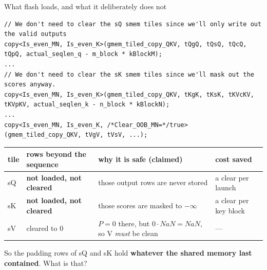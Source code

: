 \documentclass[aspectratio=169,11pt]{beamer}
\newcommand{\NaN}{NaN}
\begin{document}
\begin{frame}[fragile]{What flash loads, and what it deliberately does not}
\begin{lstlisting}
// We don't need to clear the sQ smem tiles since we'll only write out the valid outputs
copy<Is_even_MN, Is_even_K>(gmem_tiled_copy_QKV, tQgQ, tQsQ, tQcQ, tQpQ, actual_seqlen_q - m_block * kBlockM);
...
// We don't need to clear the sK smem tiles since we'll mask out the scores anyway.
copy<Is_even_MN, Is_even_K>(gmem_tiled_copy_QKV, tKgK, tKsK, tKVcKV, tKVpKV, actual_seqlen_k - n_block * kBlockN);
...
copy<Is_even_MN, Is_even_K, /*Clear_OOB_MN=*/true>(gmem_tiled_copy_QKV, tVgV, tVsV, ...);
\end{lstlisting}
\vspace{1mm}
\begin{center}\scriptsize
\begin{tabular}{l>{\raggedright\arraybackslash}p{3.4cm}>{\raggedright\arraybackslash}p{5.6cm}>{\raggedright\arraybackslash}p{2.6cm}}
\toprule
tile & rows beyond the sequence & why it is safe (claimed) & cost saved \\
\midrule
sQ & \textbf{not loaded, not cleared} & those output rows are never stored & a clear per launch \\
sK & \textbf{not loaded, not cleared} & those scores are masked to $-\infty$ & a clear per key block \\
sV & cleared to 0 & $P=0$ there, but $0\cdot\NaN=\NaN$, so V \emph{must} be clean & --- \\
\bottomrule
\end{tabular}
\end{center}
\vspace{1mm}
\small So the padding rows of sQ and sK hold \textbf{whatever the shared memory last contained}. What is that?
\end{frame}
\end{document}
